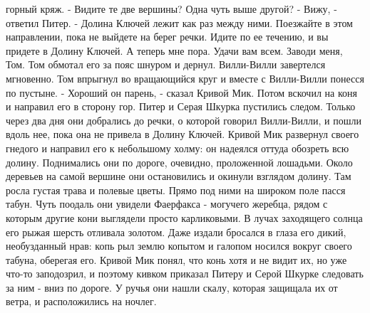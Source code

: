 горный кряж.
    - Видите те две вершины? Одна чуть выше другой?
    - Вижу, - ответил Питер.
    - Долина Ключей лежит как раз между ними. Поезжайте в этом 
направлении, пока не выйдете на берег речки. Идите по ее течению, и вы 
придете в Долину Ключей. А теперь мне пора. Удачи вам всем. Заводи 
меня, Том.
    Том обмотал его за пояс шнуром и дернул. Вилли-Вилли завертелся 
мгновенно. Том впрыгнул во вращающийся круг и вместе с Вилли-Вилли 
понесся по пустыне.
    - Хороший он парень, - сказал Кривой Мик. Потом вскочил на коня и 
направил его в сторону гор. Питер и Серая Шкурка пустились следом.
    Только через два дня они добрались до речки, о которой говорил 
Вилли-Вилли, и пошли вдоль нее, пока она не привела в Долину Ключей.
    Кривой Мик развернул своего гнедого и направил его к небольшому 
холму: он надеялся оттуда обозреть всю долину. Поднимались они по 
дороге, очевидно, проложенной лошадьми. Около деревьев на самой 
вершине они остановились и окинули взглядом долину. Там росла густая 
трава и полевые цветы.
    Прямо под ними на широком поле пасся табун. Чуть поодаль они 
увидели Фаерфакса - могучего жеребца, рядом с которым другие кони 
выглядели просто карликовыми. В лучах заходящего солнца его рыжая 
шерсть отливала золотом. Даже издали бросался в глаза его дикий, 
необузданный нрав: копь рыл землю копытом и галопом носился вокруг 
своего табуна, оберегая его.
    Кривой Мик понял, что конь хотя и не видит их, но уже что-то 
заподозрил, и поэтому кивком приказал Питеру и Серой Шкурке следовать 
за ним - вниз по дороге. У ручья они нашли скалу, которая защищала их 
от ветра, и расположились на ночлег.
